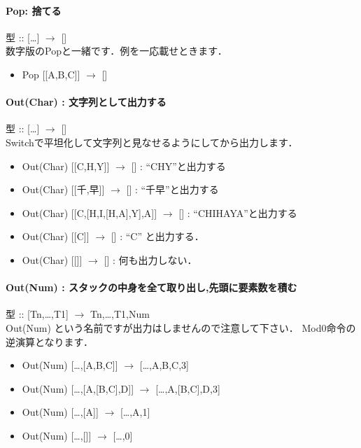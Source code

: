 \paragraph{Pop: 捨てる}

型 :: {[}\ldots{}{]} $\to$
{[}{]}\\数字版のPopと一緒です．例を一応載せときます．

\begin{itemize}
\item
  Pop {[}{[}A,B,C{]}{]} $\to$ {[}{]}
\end{itemize}

\paragraph{Out(Char) : 文字列として出力する}

型 :: {[}\ldots{}{]} $\to$ {[}{]}\\
Switchで平坦化して文字列と見なせるようにしてから出力します．

\begin{itemize}
\item
  Out(Char) {[}{[}C,H,Y{]}{]} $\to$ {[}{]} : ``CHY''と出力する
\item
  Out(Char) {[}{[}千,早{]}{]} $\to$ {[}{]} :
  ``千早''と出力する
\item
  Out(Char) {[}{[}C,{[}H,I,{[}H,A{]},Y{]},A{]}{]} $\to$ {[}{]}
  : ``CHIHAYA''と出力する
\item
  Out(Char) {[}{[}C{]}{]} $\to$ {[}{]} : ``C'' と出力する．
\item
  Out(Char) {[}{[}{]}{]} $\to$ {[}{]} : 何も出力しない．
\end{itemize}

\paragraph{Out(Num) : スタックの中身を全て取り出し,先頭に要素数を積む}

型 :: {[}Tn,\ldots{},T1{]} $\to$ Tn,\ldots{},T1,Num\\Out(Num)
という名前ですが出力はしませんので注意して下さい．
Mod0命令の逆演算となります．

\begin{itemize}
\item
  Out(Num) {[}\ldots{},{[}A,B,C{]}{]} $\to$
  {[}\ldots{},A,B,C,3{]}
\item
  Out(Num) {[}\ldots{},{[}A,{[}B,C{]},D{]}{]} $\to$
  {[}\ldots{},A,{[}B,C{]},D,3{]}
\item
  Out(Num) {[}\ldots{},{[}A{]}{]} $\to$ {[}\ldots{},A,1{]}
\item
  Out(Num) {[}\ldots{},{[}{]}{]} $\to$ {[}\ldots{},0{]}
\end{itemize}

